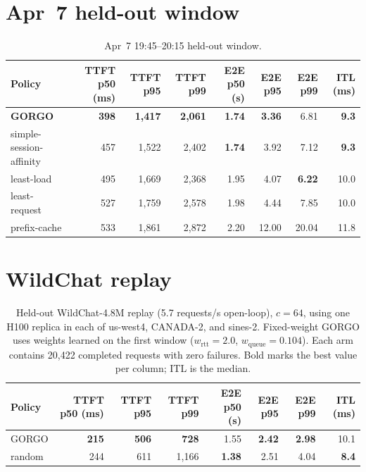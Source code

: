 \documentclass{article}
\begin{document}
\FloatBarrier
\section{Apr~7 held-out window}
\label{app:apr7}

\begin{table}[h]
\centering
\small
\setlength{\tabcolsep}{2.7pt}
\caption{Apr~7 19:45--20:15 held-out window.}
\label{tab:apr7_ts3}
\begin{tabular}{lrrrrrrr}
\toprule
Policy & TTFT p50 (ms) & TTFT p95 & TTFT p99 & E2E p50 (s) & E2E p95 & E2E p99 & ITL (ms) \\
\midrule
\textbf{GORGO}          & \textbf{398} & \textbf{1{,}417} & \textbf{2{,}061} & \textbf{1.74}  & \textbf{3.36}  & 6.81           & \textbf{9.3} \\
simple-session-affinity & 457          & 1{,}522          & 2{,}402          & \textbf{1.74}  & 3.92           & 7.12           & \textbf{9.3} \\
least-load              & 495          & 1{,}669          & 2{,}368          & 1.95           & 4.07           & \textbf{6.22}  & 10.0 \\
least-request           & 527          & 1{,}759          & 2{,}578          & 1.98           & 4.44           & 7.85           & 10.0 \\
prefix-cache            & 533          & 1{,}861          & 2{,}872          & 2.20           & 12.00          & 20.04          & 11.8 \\
\bottomrule
\end{tabular}
\end{table}

\section{WildChat replay}
\label{app:wildchat}

\begin{table}[htbp]
\centering
\small
\caption{Held-out WildChat-4.8M replay
(5.7 requests/s open-loop), $c{=}64$, using one H100 replica in each of
us-west4, CANADA-2, and sines-2. Fixed-weight GORGO uses weights learned on
the first window ($w_{\mathrm{rtt}}{=}2.0$,
$w_{\mathrm{queue}}{=}0.104$). Each arm contains 20{,}422 completed requests
with zero failures. Bold marks the best value per column; ITL is the median.}
\label{tab:wildchat}
\setlength{\tabcolsep}{2.7pt}
\begin{tabular}{lrrrrrrr}
\toprule
Policy & TTFT p50 (ms) & TTFT p95 & TTFT p99 & E2E p50 (s) & E2E p95 & E2E p99 & ITL (ms) \\
\midrule
GORGO  & \textbf{215} & \textbf{506} & \textbf{728}   & 1.55          & \textbf{2.42} & \textbf{2.98} & 10.1 \\
random & 244          & 611          & 1{,}166         & \textbf{1.38} & 2.51          & 4.04          & \textbf{8.4} \\
\bottomrule
\end{tabular}
\end{table}
\end{document}
